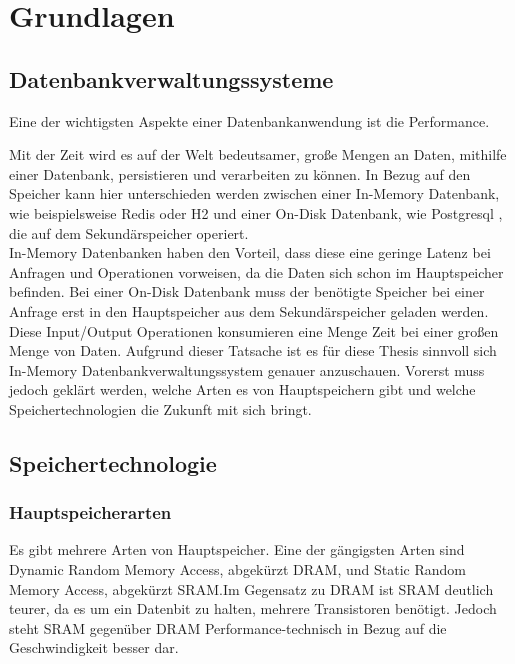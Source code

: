 \chapter{Grundlagen}
\label{Grundlagen}

\section{Datenbankverwaltungssysteme}

Eine der wichtigsten Aspekte einer Datenbankanwendung ist die Performance. 

Mit der Zeit wird es auf der Welt bedeutsamer, große Mengen an Daten, mithilfe einer Datenbank, persistieren und verarbeiten zu können.\cite{Memory:Usage}
In Bezug auf den Speicher kann hier unterschieden werden zwischen einer In-Memory Datenbank, wie beispielsweise Redis \cite{Redis} oder H2 \cite{H2} und einer On-Disk Datenbank, wie Postgresql \cite{PostgreSQL}, die auf dem Sekundärspeicher operiert. \\

In-Memory Datenbanken haben den Vorteil, dass diese eine geringe Latenz bei Anfragen und Operationen vorweisen, da die Daten sich schon im Hauptspeicher befinden. Bei einer On-Disk Datenbank muss der benötigte Speicher bei einer Anfrage erst in den Hauptspeicher aus dem Sekundärspeicher geladen werden. Diese Input/Output Operationen konsumieren eine Menge Zeit bei einer großen Menge von Daten.\cite{KABAKUS2017520}
Aufgrund dieser Tatsache ist es für diese Thesis sinnvoll sich In-Memory Datenbankverwaltungssystem genauer anzuschauen. 
Vorerst muss jedoch geklärt werden, welche Arten es von Hauptspeichern gibt und welche Speichertechnologien die Zukunft mit sich bringt.

\section{Speichertechnologie}

\subsection{Hauptspeicherarten}

Es gibt mehrere Arten von Hauptspeicher. Eine der gängigsten Arten sind Dynamic Random Memory Access, abgekürzt DRAM, und Static Random Memory Access, abgekürzt SRAM.Im Gegensatz zu DRAM ist SRAM deutlich teurer, da es um ein Datenbit zu halten, mehrere Transistoren benötigt. Jedoch steht SRAM gegenüber DRAM Performance-technisch in Bezug auf die Geschwindigkeit besser dar.\cite{techtarget:Ram}


